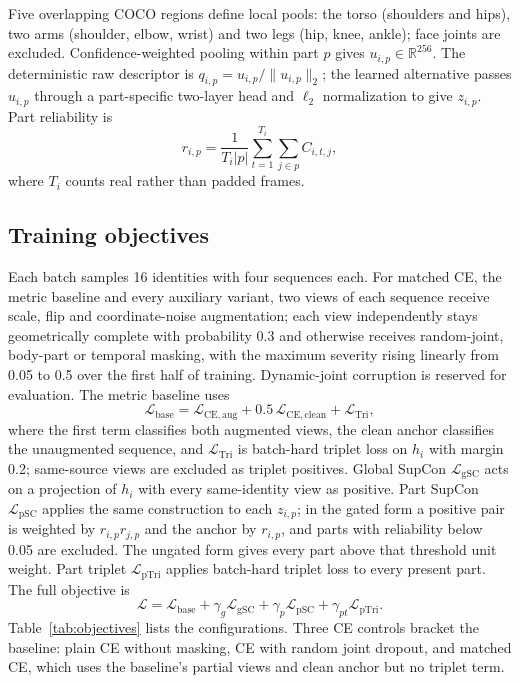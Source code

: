 \documentclass[review,12pt]{elsarticle}
\newcommand{\R}{\mathbb{R}}
\newcommand{\Lbase}{\mathcal{L}_{\mathrm{base}}}
\newcommand{\Lglobal}{\mathcal{L}_{\mathrm{gSC}}}
\newcommand{\Lpart}{\mathcal{L}_{\mathrm{pSC}}}
\newcommand{\Lptrip}{\mathcal{L}_{\mathrm{pTri}}}
\begin{document}
Five overlapping COCO regions define local pools: the torso (shoulders and
hips), two arms (shoulder, elbow, wrist) and two legs (hip, knee, ankle); face
joints are excluded. Confidence-weighted pooling within part $p$ gives
$u_{i,p}\in\R^{256}$. The deterministic raw descriptor is
$q_{i,p}=u_{i,p}/\lVert u_{i,p}\rVert_2$; the learned alternative passes
$u_{i,p}$ through a part-specific two-layer head and $\ell_2$ normalization to
give $z_{i,p}$. Part reliability is
\begin{equation}
 r_{i,p}=\frac{1}{T_i|p|}\sum_{t=1}^{T_i}\sum_{j\in p}C_{i,t,j},
 \label{eq:reliability}
\end{equation}
where $T_i$ counts real rather than padded frames.

\subsection{Training objectives}

Each batch samples 16 identities with four sequences each. For matched CE, the
metric baseline and every auxiliary variant, two views of each sequence receive
scale, flip and coordinate-noise augmentation; each view
independently stays geometrically complete with probability 0.3 and otherwise
receives random-joint, body-part or temporal masking, with the maximum
severity rising linearly from 0.05 to 0.5 over the first half of training.
Dynamic-joint corruption is reserved for evaluation. The metric baseline uses
\begin{equation}
 \Lbase = \mathcal{L}_{\mathrm{CE,aug}} + 0.5\,\mathcal{L}_{\mathrm{CE,clean}} + \mathcal{L}_{\mathrm{Tri}},
 \label{eq:base}
\end{equation}
where the first term classifies both augmented views, the clean anchor
classifies the unaugmented sequence, and $\mathcal{L}_{\mathrm{Tri}}$ is
batch-hard triplet loss \cite{hermans2017triplet} on $h_i$ with margin 0.2;
same-source views are excluded as triplet positives. Global SupCon $\Lglobal$
acts on a projection of $h_i$ with every same-identity view as positive. Part
SupCon $\Lpart$ applies the same construction to each $z_{i,p}$; in the gated
form a positive pair is weighted by $r_{i,p}r_{j,p}$ and the anchor by
$r_{i,p}$, and parts with reliability below 0.05 are excluded. The ungated form
gives every part above that threshold unit weight. Part triplet $\Lptrip$
applies batch-hard triplet loss to every present part. The full objective is
\begin{equation}
 \mathcal{L}=\Lbase+\gamma_g\Lglobal+\gamma_p\Lpart+\gamma_{pt}\Lptrip .
 \label{eq:objective}
\end{equation}
Table~\ref{tab:objectives} lists the configurations. Three CE controls bracket
the baseline: plain CE without masking, CE with random joint dropout, and
matched CE, which uses the baseline's partial views and clean anchor but no
triplet term.
\end{document}
